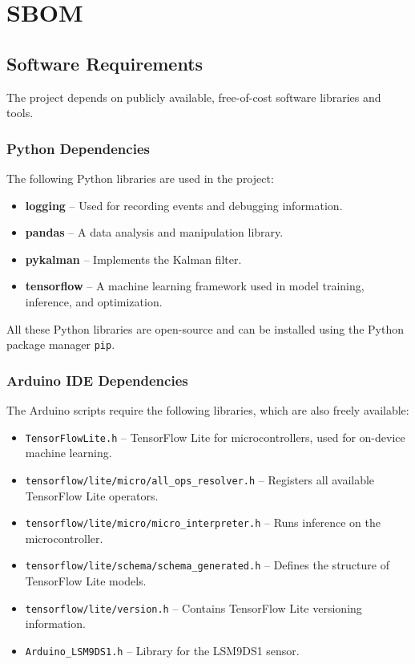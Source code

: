 %
%
%


\chapter{SBOM}

\section{Software Requirements}
The project depends on publicly available, free-of-cost software libraries and tools.

\subsection{Python Dependencies}
The following Python libraries are used in the project:

\begin{itemize}
    \item \textbf{logging} – Used for recording events and debugging information.
    \item \textbf{pandas} – A data analysis and manipulation library.
    \item \textbf{pykalman} – Implements the Kalman filter.
    \item \textbf{tensorflow} – A machine learning framework used in model training, inference, and optimization.
\end{itemize}

All these Python libraries are open-source and can be installed using the Python package manager \texttt{pip}.

\subsection{Arduino IDE Dependencies}
The Arduino scripts require the following libraries, which are also freely available:

\begin{itemize}
    \item \texttt{TensorFlowLite.h} – TensorFlow Lite for microcontrollers, used for on-device machine learning.
    \item \texttt{tensorflow/lite/micro/all\_ops\_resolver.h} – Registers all available TensorFlow Lite operators.
    \item \texttt{tensorflow/lite/micro/micro\_interpreter.h} – Runs inference on the microcontroller.
    \item \texttt{tensorflow/lite/schema/schema\_generated.h} – Defines the structure of TensorFlow Lite models.
    \item \texttt{tensorflow/lite/version.h} – Contains TensorFlow Lite versioning information.
    \item \texttt{Arduino\_LSM9DS1.h} – Library for the LSM9DS1 sensor.
\end{itemize}

